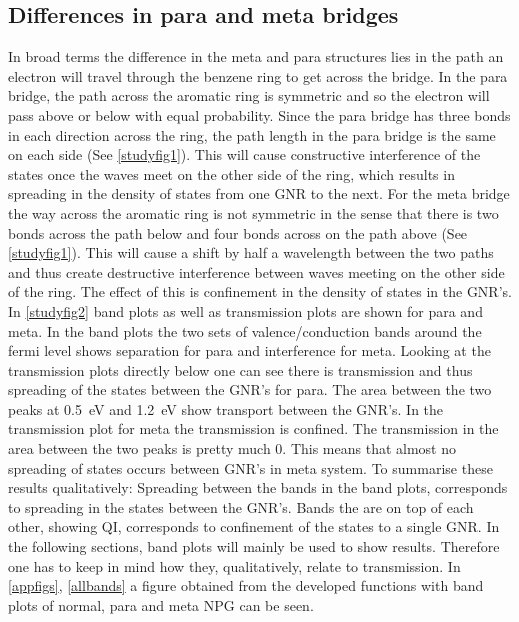 \subsection{Differences in para and meta bridges}
In broad terms the difference in the meta and para structures lies in the path an electron will travel through the benzene ring to get across the bridge. In the para bridge, the path across the aromatic ring is symmetric and so the electron will pass above or below with equal probability. Since the para bridge has three bonds in each direction across the ring, the path length in the para bridge is the same on each side (See \cref{studyfig1}). This will cause constructive interference of the states once the waves meet on the other side of the ring, which results in spreading in the density of states from one GNR to the next. For the meta bridge the way across the aromatic ring is not symmetric in the sense that there is two bonds across the path below and four bonds across on the path above (See \cref{studyfig1}). This will cause a shift by half a wavelength between the two paths and thus create destructive interference between waves meeting on the other side of the ring. The effect of this is confinement in the density of states in the GNR's. In \cref{studyfig2} band plots as well as transmission plots are shown for para and meta. In the band plots the two sets of valence/conduction bands around the fermi level shows separation for para and interference for meta. Looking at the transmission plots directly below one can see there is transmission  and thus spreading of the states between the GNR's for para. The area between the two peaks at \SI{0.5}{\electronvolt} and  \SI{1.2}{\electronvolt} show transport between the GNR's. In the transmission plot for meta the transmission is confined. The transmission in the area between the two peaks is pretty much 0. This means that almost no spreading of states occurs between GNR's in meta system. To summarise these results qualitatively: Spreading between the bands in the band plots, corresponds to spreading in the states between the GNR's. Bands the are on top of each other, showing QI, corresponds to confinement of the states to a single GNR. In the following sections, band plots will mainly be used to show results. Therefore one has to keep in mind how they, qualitatively, relate to transmission. In \cref{appfigs}, \cref{allbands} a figure obtained from the developed functions with band plots of normal, para and meta NPG can be seen. 
